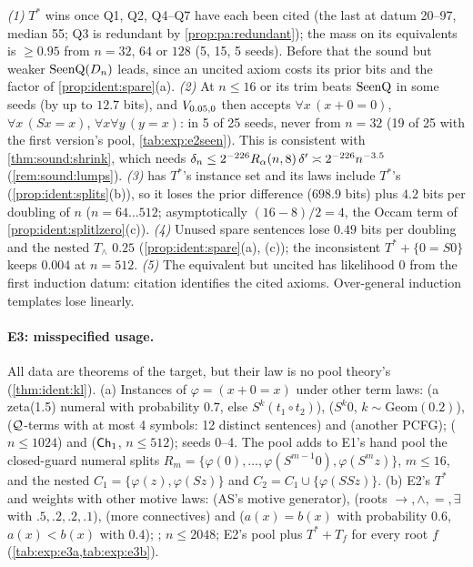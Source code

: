 \noindent\emph{(1)} $T^*$ wins once Q1, Q2, Q4--Q7 have each been cited (the last at datum 20--97, median 55; Q3 is redundant by \cref{prop:pa:redundant}); the mass on its equivalents is $\ge0.95$ from $n=32$, $64$ or $128$ (5, 15, 5 seeds). Before that the sound but weaker $\mathrm{SeenQ}(D_n)$ leads, since an uncited axiom costs its prior bits and the factor of \cref{prop:ident:spare}(a).
\emph{(2)} At $n\le16$  or its trim beats $\mathrm{SeenQ}$ in some seeds (by up to $12.7$ bits), and $V_{0.05,0}$ then accepts $\forall x\,(x+0=0)$, $\forall x\,(Sx=x)$, $\forall x\forall y\,(y=x)$: in 5 of 25 seeds, never from $n=32$ (19 of 25 with the first version's pool, \cref{tab:exp:e2seen}). This is consistent with \cref{thm:sound:shrink}, which needs $\delta_n\le2^{-226}R_{\alpha}(n,8)\,\delta'\asymp2^{-226}n^{-3.5}$ (\cref{rem:sound:lumps}).
\emph{(3)}  has $T^*$'s instance set and its laws include $T^*$'s (\cref{prop:ident:splits}(b)), so it loses the prior difference ($698.9$ bits) plus $4.2$ bits per doubling of $n$ ($n=64\ldots512$; asymptotically $(16-8)/2=4$, the Occam term of \cref{prop:ident:splitlzero}(c)).
\emph{(4)} Unused spare sentences lose $0.49$ bits per doubling and the nested $T_\wedge$ $0.25$ (\cref{prop:ident:spare}(a), (c)); the inconsistent $T^*+\{0=S0\}$ keeps $0.004$ at $n=512$.
\emph{(5)} The equivalent but uncited  has likelihood $0$ from the first induction datum: citation identifies the cited axioms. Over-general induction templates lose linearly.

\paragraph{E3: misspecified usage.}
All data are theorems of the target, but their law is no pool theory's (\cref{thm:ident:kl}).
(a) Instances of $\varphi=(x+0=x)$ under other term laws:  (a zeta(1.5) numeral with probability $0.7$, else $S^k(t_1\circ t_2)$),  ($S^k0$, $k\sim\mathrm{Geom}(0.2)$),  ($\mathcal{Q}$-terms with at most 4 symbols: 12 distinct sentences) and  (another PCFG); \Lzero{} ($n\le1024$) and \Lone{} ($\mathsf{Ch}_{1}$, $n\le512$); seeds 0--4. The pool adds to E1's hand pool the closed-guard numeral splits $R_m=\{\varphi(0),\dots,\varphi(S^{m-1}0),\varphi(S^mz)\}$, $m\le16$, and the nested $C_1=\{\varphi(z),\varphi(Sz)\}$ and $C_2=C_1\cup\{\varphi(SSz)\}$.
(b) E2's $T^*$ and weights with other motive laws:  (AS's motive generator),  (roots $\to,\wedge,=,\exists$ with $.5,.2,.2,.1$),  (more connectives) and  ($a(x)=b(x)$ with probability $0.6$, $a(x)<b(x)$ with $0.4$); \Lzero; $n\le2048$; E2's pool plus $T^*+T_f$ for every root $f$ (\cref{tab:exp:e3a,tab:exp:e3b}).

